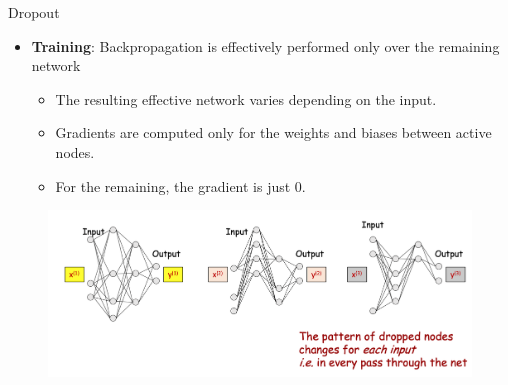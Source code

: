 \documentclass[serif, aspectratio=169]{beamer}
\begin{document}
\begin{frame}{Dropout}
	\begin{itemize}
		\item \textbf{Training}: Backpropagation is effectively performed only over the remaining network
		\begin{itemize}
			\item The resulting effective network varies depending on the input.
			\item Gradients are computed only for the weights and biases between active nodes.
			\item For the remaining, the gradient is just 0.
		\end{itemize}
	\end{itemize}
	
	\begin{figure}[htpb]
		\begin{center}
			\includegraphics[keepaspectratio, scale=0.23]{pic/dropout3}
		\end{center}
	\end{figure}
\end{frame}
\end{document}

